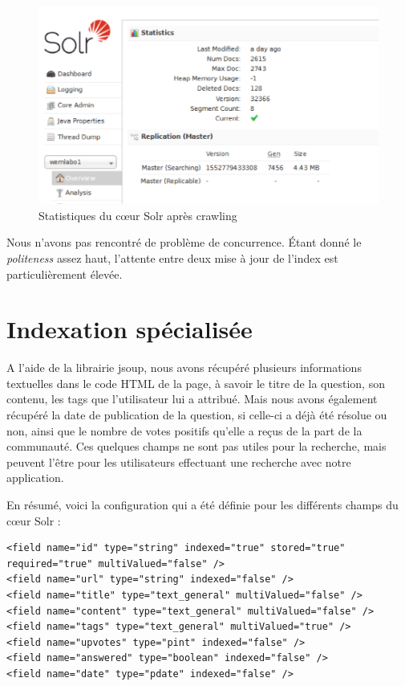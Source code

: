 \documentclass[a4paper]{article}
\begin{document}
	\begin{figure}[H]
		\centering
		\includegraphics[width=\columnwidth]{images/01-solr-stats.png}
		\caption{Statistiques du cœur Solr après crawling}
	\end{figure}

	Nous n'avons pas rencontré de problème de concurrence. Étant donné le \emph{politeness} assez haut,
	l'attente entre deux mise à jour de l'index est particulièrement élevée.
	
	\section{Indexation spécialisée}
	A l'aide de la librairie jsoup, nous avons récupéré plusieurs informations textuelles dans le code HTML de la page,
	à savoir le titre de la question, son contenu, les tags que l'utilisateur lui a attribué.
	Mais nous avons également récupéré la date de publication de la question, si celle-ci a déjà été résolue ou non,
	ainsi que le nombre de votes positifs qu'elle a reçus de la part de la communauté. Ces quelques champs ne sont pas utiles pour la recherche,
	mais peuvent l'être pour les utilisateurs effectuant une recherche avec notre application.
	
	En résumé, voici la configuration qui a été définie pour les différents champs du cœur Solr :

	\lstset{language=XML}
	\begin{lstlisting}
<field name="id" type="string" indexed="true" stored="true" required="true" multiValued="false" />
<field name="url" type="string" indexed="false" />
<field name="title" type="text_general" multiValued="false" />
<field name="content" type="text_general" multiValued="false" />
<field name="tags" type="text_general" multiValued="true" />
<field name="upvotes" type="pint" indexed="false" />
<field name="answered" type="boolean" indexed="false" />
<field name="date" type="pdate" indexed="false" />
	\end{lstlisting}
\end{document}
